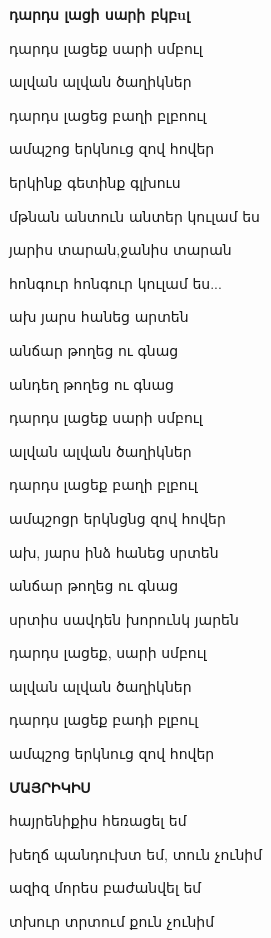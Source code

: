                        {\bf  {\bf դարդս լացի  սարի բկբuլ}



            դարդս լացեք սարի սմբուլ



          ալվան ալվան ծաղիկներ


          դարդս   լացեց բաղի բլբոուլ

          ամպշոց երկնուց զով  հովեր




          երկինք գետինք գլխուս


          մթնան անտուն անտեր կուլամ ես

        յարիս տարան,ջանիս տարան

             հոնգուր հոնգուր կուլամ ես...

       ախ յարս հանեց արտեն

          անճար թողեց  ու գնաց


          անդեղ թողեց ու գնաց

     դարդս      լացեք սարի   սմբուլ


     ալվան ալվան   ծաղիկներ



դարդս     լացեք բաղի բլբուլ


ամպշոցր երկնցնց զով հովեր


          
ախ, յարս ինձ հանեց սրտեն

          անճար թողեց ու գնաց 


          սրտիս սավդեն խորունկ յարեն


      



           դարդս լացեք, սարի  սմբուլ 

           ալվան ալվան ծաղիկներ


           դարդս լացեք բադի բլբուլ


           ամպշոց երկնուց զով հովեր





                    \centerline {\bf {ՄԱՅՐԻԿԻՍ  }}



                    հայրենիքիս հեռացել եմ


                    խեղճ պանդուխտ եմ, տուն չունիմ 


                    ազիզ մորես բաժանվել եմ



                   տխուր տրտում քուն չունիմ
                        



}
